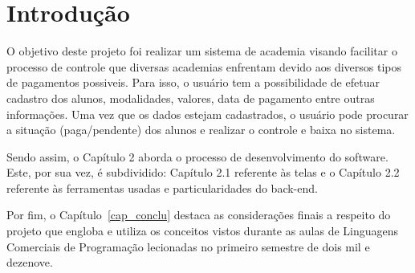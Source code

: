 \chapter{Introdução}\label{cap_intro}

O objetivo deste projeto foi realizar um sistema de academia visando facilitar o processo de controle que diversas academias enfrentam devido aos diversos tipos de pagamentos possiveis. Para isso, o usuário tem a possibilidade de efetuar cadastro dos alunos, modalidades, valores, data de pagamento entre outras informações. Uma vez que os dados estejam cadastrados, o usuário pode procurar a situação (paga/pendente) dos alunos e realizar o controle e baixa no sistema.

Sendo assim, o Capítulo 2 aborda o processo de desenvolvimento do software. Este, por sua vez, é subdividido: Capítulo 2.1 referente às telas e o Capítulo 2.2 referente às ferramentas usadas e particularidades do back-end.

 Por fim, o Capítulo~\ref{cap_conclu} destaca as considerações finais a respeito do projeto que engloba e utiliza os conceitos vistos durante as aulas de Linguagens Comerciais de Programação lecionadas no primeiro semestre de dois mil e dezenove.
